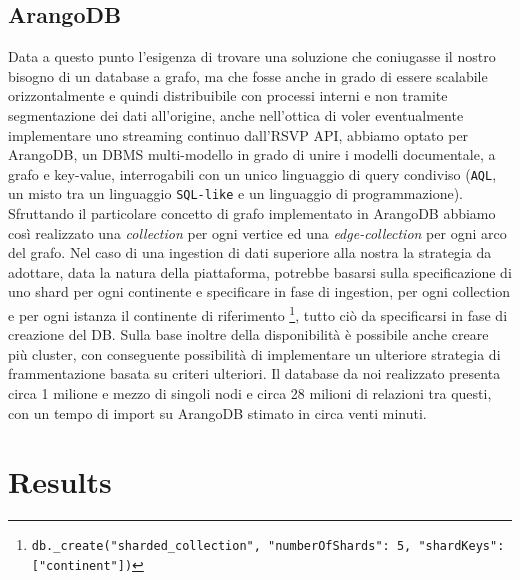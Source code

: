 \documentclass[fleqn,10pt]{SelfArx} %
\begin{document}
{\subsection{ArangoDB}
Data a questo punto l'esigenza di trovare una soluzione che coniugasse il nostro bisogno di un database a grafo, ma che fosse anche in grado di essere scalabile orizzontalmente e quindi distribuibile con processi interni e non tramite segmentazione dei dati all'origine, anche nell'ottica di voler eventualmente implementare uno streaming continuo dall'RSVP API, abbiamo optato per ArangoDB, un DBMS multi-modello in grado di unire i modelli documentale, a grafo e key-value, interrogabili con un unico linguaggio di query condiviso (\texttt{AQL}, un misto tra un linguaggio \texttt{SQL-like} e un linguaggio di programmazione). %
Sfruttando il particolare concetto di grafo implementato in ArangoDB abbiamo così realizzato una \textit{collection} per ogni vertice ed una \textit{edge-collection} per ogni arco del grafo. Nel caso di una ingestion di dati superiore alla nostra la strategia da adottare, data la natura della piattaforma, potrebbe basarsi sulla specificazione di uno shard per ogni continente e specificare in fase di ingestion, per ogni collection e per ogni istanza il continente di riferimento 
\footnote{\texttt{db.\_create("sharded\_collection", {"numberOfShards": 5, "shardKeys": ["continent"]})}}, tutto ciò da specificarsi in fase di creazione del DB. Sulla base inoltre della disponibilità è possibile anche creare più cluster, con conseguente possibilità di implementare un ulteriore strategia di frammentazione basata su criteri ulteriori.
Il database da noi realizzato presenta circa 1 milione e mezzo di singoli nodi e circa 28 milioni di relazioni tra questi, con un tempo di import su ArangoDB stimato in circa venti minuti.

\section{Results}
}
\end{document}
